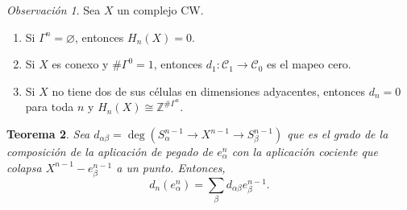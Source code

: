\documentclass[11pt,a4paper]{article}
\theoremstyle{plain}
\newtheorem{theorem}{Teorema}[section]
\theoremstyle{definition}
\theoremstyle{remark}
\newtheorem{remark}[theorem]{Observación}
\newcommand{\ZZ}{\mathbb Z}
\begin{document}
\begin{remark}
\label{obs:cw-observaciones}
Sea $X$ un complejo CW.
\begin{enumerate}[label=\arabic*.]
\item Si $\Gamma^n=\varnothing$, entonces $H_n(X)=0$.
\item Si $X$ es conexo y $\#\Gamma^0=1$, entonces $d_1:\mathcal C_1\to\mathcal C_0$
es el mapeo cero.
\item Si $X$ no tiene dos de sus células en dimensiones adyacentes,
entonces $d_n=0$ para toda $n$ y $H_n(X)\cong\ZZ^{\#\Gamma^n}$.
\end{enumerate}
\end{remark}

\begin{theorem}
\label{thm:grado-pegado}
Sea $d_{\alpha\beta}=\deg(S^{n-1}_\alpha\to X^{n-1}\to S^{n-1}_\beta)$ que es
el grado de la composición de la aplicación de pegado de $e^n_\alpha$ con la
aplicación cociente que colapsa $X^{n-1}-e^{n-1}_\beta$ a un punto.
Entonces,
\[
d_n(e^n_\alpha)=\sum_\beta d_{\alpha\beta}e_\beta^{n-1}.
\]
\end{theorem}
\end{document}
